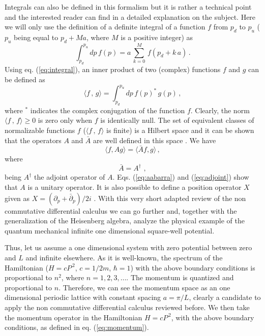 \documentclass[a4paper,12pt]{article}
\begin{document}
Integrals can also be defined in this formalism but 
it is rather a technical point and the interested 
reader can find in \cite{dimakis1} a detailed 
explanation on the subject. Here we will 
only use the definition of a definite integral of a function 
$f$ from $p_{d}$ to $p_{u}$ ( $p_{u}$ being equal to 
$p_{d} + M  a$, 
where $M$ is a positive integer) as 
\begin{equation}
    \int_{p_{d}}^{p_{u}} dp \, f(p) = a \, 
    \sum_{k=0}^{M} \, f(p_{d} + k \, a) \, .
    \label{eq:integral}
\end{equation} 
Using eq. (\ref{eq:integral}), 
an inner product of two (complex) functions 
$f$ and $g$ can be defined as 
\begin{equation}
    \langle f \, , \, g \rangle = \int_{p_{d}}^{p_{u}} dp \, f(p)^{*} \, g(p) \, , 
    \label{eq:inner}
\end{equation}
where $^{*}$ indicates the complex conjugation of the function $f$.  Clearly, 
the norm $\langle f \, , \, f \rangle \geq 0$ is
zero only when $f$ is identically null.  The set of equivalent classes  
of normalizable functions $f$ ($\langle f \, , \, f \rangle $ is finite) 
is a Hilbert space and it can be shown that   
the operators $A$ and $\bar{A}$ are well defined in 
this space \cite{dimakis1}. We have
\begin{equation}
    \langle f, A g \rangle = \langle \bar{A} f, g \rangle \, ,
    \label{eq:inner2}
\end{equation}
where  
\begin{equation}
    \bar{A} = A^\dagger \, \, ,
    \label{eq:adjoint}
\end{equation}
being $A^\dagger$ the adjoint operator of $A$.  Eqs. (\ref{eq:aabarra}) and 
(\ref{eq:adjoint}) show that $A$ is a unitary operator. 
It is also possible to define a position operator $X$ given as
$X = (\partial_{p} + \bar{\partial}_{p})/2 i$ \cite{dimakis1}. 
With this very short 
adapted review of the non commutative differential calculus 
we can go further and, 
together with the generalization of the Heisenberg algebra, analyze the  
physical example of the 
quantum mechanical infinite one dimensional square-well potential. 

Thus, let us assume a one dimensional system with 
zero potential between zero 
and $L$ and infinite elsewhere. As it is well-known, the spectrum of the 
Hamiltonian ($H= c P^{\, 2}$, $c=1/2m$, $\hbar = 1$) 
with the above boundary conditions is proportional 
to $n^2$, where 
$n = 1, 2, 3, \ldots$.  The momentum is quantized and 
proportional to $n$.  Therefore, we can 
see the momentum space as an one dimensional periodic lattice 
with constant spacing $a= \pi/L$, clearly 
a candidate to apply the non commutative differential 
calculus reviewed before. We then take the momentum operator
in the Hamiltonian $H= c P^{\, 2}$, with the above boundary conditions,
as defined in eq. (\ref{eq:momentum}). 
\end{document}
